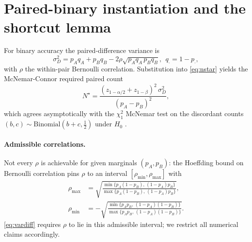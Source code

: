 \documentclass{article}
\theoremstyle{plain}
\theoremstyle{definition}
\begin{document}
\section{Paired-binary instantiation and the shortcut lemma}
\label{sec:binary}

For binary accuracy the paired-difference variance is
\begin{equation}
\label{eq:vardiff}
\sigma_D^2 = p_A q_A + p_B q_B - 2\rho\sqrt{p_A q_A\,p_B q_B}, \;\, q_\cdot{=}1{-}p_\cdot,
\end{equation}
with $\rho$ the within-pair Bernoulli correlation. Substitution into \cref{eq:nstar} yields the McNemar-Connor required paired count
\begin{equation}
\label{eq:reqn_exact}
N^{\star} = \frac{(z_{1-\alpha/2}+z_{1-\beta})^2\,\sigma_D^2}{(p_A-p_B)^2},
\end{equation}
which agrees asymptotically with the $\chi^2_1$ McNemar test on the discordant counts $(b,c)\sim\mathrm{Binomial}(b{+}c,\tfrac12)$ under $H_0$ \citep{mcnemar1947note,connor1987sample}.

\paragraph{Admissible correlations.} Not every $\rho$ is achievable for given marginals $(p_A,p_B)$: the Hoeffding bound on Bernoulli correlation pins $\rho$ to an interval $[\rho_{\min},\rho_{\max}]$ with
\begin{align}
\rho_{\max} &= \sqrt{\tfrac{\min\{p_A(1{-}p_B),\,(1{-}p_A)p_B\}}{\max\{p_A(1{-}p_B),\,(1{-}p_A)p_B\}}},\\
\rho_{\min} &= -\sqrt{\tfrac{\min\{p_A p_B,\,(1{-}p_A)(1{-}p_B)\}}{\max\{p_A p_B,\,(1{-}p_A)(1{-}p_B)\}}}.
\end{align}
\cref{eq:vardiff} requires $\rho$ to lie in this admissible interval; we restrict all numerical claims accordingly.
\end{document}
